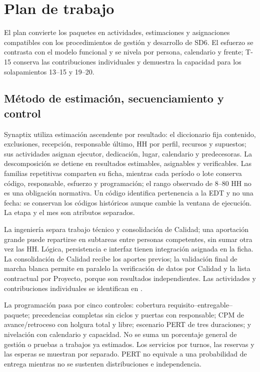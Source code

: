 \newpage
\section{Plan de trabajo} %
El plan convierte los paquetes en actividades, estimaciones y asignaciones compatibles con los procedimientos de gestión y desarrollo de SD6. El esfuerzo se contrasta con el modelo funcional y se nivela por persona, calendario y frente; T-15 conserva las contribuciones individuales y demuestra la capacidad para los solapamientos 13--15 y 19--20.




\subsection{Método de estimación, secuenciamiento y control} %
Synaptix utiliza estimación ascendente por resultado: el diccionario fija contenido, exclusiones, recepción, responsable último, HH por perfil, recursos y supuestos; sus actividades asignan ejecutor, dedicación, lugar, calendario y predecesoras. La descomposición se detiene en resultados estimables, asignables y verificables. Las familias repetitivas comparten su ficha, mientras cada período o lote conserva código, responsable, esfuerzo y programación; el rango observado de 8--80 HH no es una obligación normativa. Un código identifica pertenencia a la EDT y no una fecha: se conservan los códigos históricos aunque cambie la ventana de ejecución. La etapa y el mes son atributos separados.

La ingeniería separa trabajo técnico y consolidación de Calidad; una aportación grande puede repartirse en subtareas entre personas competentes, sin sumar otra vez las HH. Lógica, persistencia e interfaz tienen integración asignada en la ficha. La consolidación de Calidad recibe los aportes previos; la validación final de marcha blanca permite en paralelo la verificación de datos por Calidad y la lista contractual por Proyecto, porque son resultados independientes. Las actividades y contribuciones individuales se identifican en .

La programación pasa por cinco controles: cobertura requisito--entregable--paquete; precedencias completas sin ciclos y puertas con responsable; CPM de avance/retroceso con holgura total y libre; escenario PERT de tres duraciones; y nivelación con calendario y capacidad. No se suma un porcentaje general de gestión o pruebas a trabajos ya estimados. Los servicios por turnos, las reservas y las esperas se muestran por separado. PERT no equivale a una probabilidad de entrega mientras no se sustenten distribuciones e independencia.

